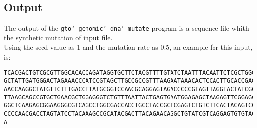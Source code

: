 \subsection*{Output}
The output of the \texttt{gto\char`_genomic\char`_dna\char`_mutate} program is a sequence file whith the synthetic mutation of input file.\\
Using the seed value as 1 and the mutation rate as 0.5, an example for this input, is: 
\begin{lstlisting}
TCACGACTGTCGCGTTGGCACACCAGATAGGTGCTTCTACGTTTTGTATCTAATTTACAATTCTCGCTGGGAGTTCATTC
GCTATTGATGGGACTAGAAACCCATCCGTAGCTTGCCGCCGTTTAAGAATAAACACTCCACTTGCACCGAGACGTAGCGC
AACCAAGGCTATGTTCTTTGACCTTATGCGGTCCAACGCAGGAGTAGACCCCCGTAGTTAGGTACTATCGCAGAATAGGC
TTAAGCAGCCGTGCTGAACGCTGGAGGGTCTGTTTAATTACTGAGTGAATGGAGAGCTAAGAGTTCGGAGCACCGCACGA
GGCTCAAGAGCGGAAGGGCGTCAGCCTGGCGACCACCTGCCTACCGCTCGAGTCTGTCTTCACTACAGTCCGTGGAGGAC
CCCCAACGACCTAGTATCCTACAAAGCCGCATACGACTTACAGAACAGGCTGTATCGTCAGGAGTGTGTACACGAAGAGT
A
\end{lstlisting}
